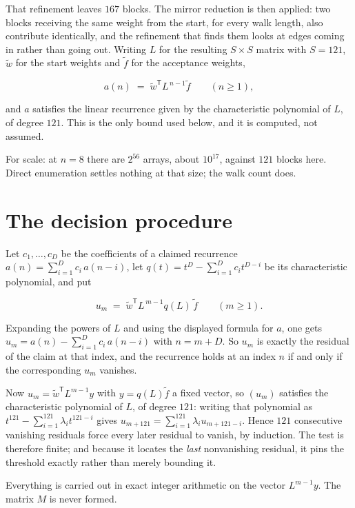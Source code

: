 \documentclass[11pt]{article}
\theoremstyle{definition}
\begin{document}
That refinement leaves $167$ blocks. The mirror reduction is then applied: two blocks receiving the same weight from the start, for every walk length, also contribute identically, and the refinement that finds them looks at edges coming in rather than going out. Writing $L$ for the resulting $S \times S$ matrix with $S = 121$, $\tilde w$ for the start weights and $\tilde f$ for the acceptance weights,

\[a(n) \;=\; \tilde w^{\mathsf T} L^{\,n-1} \tilde f \qquad (n \ge 1),\]

and $a$ satisfies the linear recurrence given by the characteristic polynomial of $L$, of degree $121$. This is the only bound used below, and it is computed, not assumed.

For scale: at $n = 8$ there are $2^{56}$ arrays, about $10^{17}$, against $121$ blocks here. Direct enumeration settles nothing at that size; the walk count does.

\section{The decision procedure}

Let $c_1,\dots,c_D$ be the coefficients of a claimed recurrence $a(n) = \sum_{i=1}^{D} c_i\,a(n-i)$, let $q(t) = t^{D} - \sum_{i=1}^{D} c_i t^{D-i}$ be its characteristic polynomial, and put

\[u_m \;=\; \tilde w^{\mathsf T} L^{\,m-1} q(L)\,\tilde f \qquad (m \ge 1).\]

Expanding the powers of $L$ and using the displayed formula for $a$, one gets $u_m = a(n) - \sum_{i=1}^{D} c_i\,a(n-i)$ with $n = m + D$. So $u_m$ is exactly the residual of the claim at that index, and the recurrence holds at an index $n$ if and only if the corresponding $u_m$ vanishes.

Now $u_m = \tilde w^{\mathsf T} L^{m-1} y$ with $y = q(L)\tilde f$ a fixed vector, so $(u_m)$ satisfies the characteristic polynomial of $L$, of degree $121$: writing that polynomial as $t^{121} - \sum_{i=1}^{121} \lambda_i t^{121-i}$ gives $u_{m+121} = \sum_{i=1}^{121} \lambda_i u_{m+121-i}$. Hence $121$ consecutive vanishing residuals force every later residual to vanish, by induction. The test is therefore finite; and because it locates the {\itshape last} nonvanishing residual, it pins the threshold exactly rather than merely bounding it.

Everything is carried out in exact integer arithmetic on the vector $L^{m-1}y$. The matrix $M$ is never formed.
\end{document}
